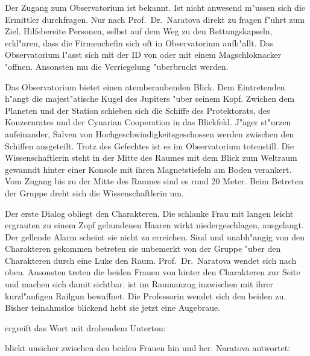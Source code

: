 Der Zugang zum Observatorium ist \ml{} bekannt. Ist \ml{} nicht anwesend m"ussen sich die Ermittler durchfragen. Nur nach Prof.~Dr.~Naratova direkt zu fragen f"uhrt zum Ziel. Hilfsbereite Personen, selbst auf dem Weg zu den Rettungskapseln, erkl"aren, dass die Firmenchefin sich oft in  Observatorium aufh"allt. Das Observatorium l"asst sich mit der ID von \ml{} oder mit einem Magschlo\3knacker "offnen. Ansonsten mu\3 die Verriegelung "uberbruckt werden.

Das Observatorium bietet einen atemberaubenden Blick. Dem Eintretenden h"angt die majest"atische Kugel des Jupiters "uber seinem Kopf. Zwichen dem Planeten und der Station schieben sich die Schiffe des Protektorats, des Konzernrates und der Cynarian Cooperation in das Blickfeld. J"ager st"urzen aufeinander, Salven von Hochgeschwindigkeitsgeschossen werden zwischen den Schiffen ausgeteilt. Trotz des Gefechtes ist es im Observatorium totenstill. Die Wissenschaftlerin steht in der Mitte des Raumes mit dem Blick zum Weltraum gewanndt hinter einer Konsole mit ihren Magnetstiefeln am Boden verankert. Vom Zugang bis zu der Mitte des Raumes sind es rund 20 Meter. Beim Betreten der Gruppe dreht sich die Wissenschaftlerin um.


Der erste Dialog obliegt den Charakteren. Die schlanke Frau mit langen leicht ergrauten zu einem Zopf gebundenen Haaren wirkt niedergeschlagen, ausgelaugt. Der gellende Alarm scheint sie nicht zu erreichen. Sind \xl{} und \ml{} unabh"angig von den Charakteren gekommen betreten sie unbemerkt von der Gruppe "uber den Charakteren durch eine Luke den Raum. Prof.~Dr.~Naratova wendet sich nach oben. Ansonsten treten die beiden Frauen von hinter den Charakteren zur Seite und machen sich damit sichtbar. \xl{} ist im Raumanzug inzwischen mit ihrer kurzl"aufigen Railgun bewaffnet. Die Professorin wendet sich den beiden zu. Bisher teinahmslos blickend hebt sie jetzt eine Augebraue.


\xl{} ergreift das Wort mit drohendem Unterton:


\ml{} blickt unsicher zwischen den beiden Frauen hin und her. Naratova antwortet:


